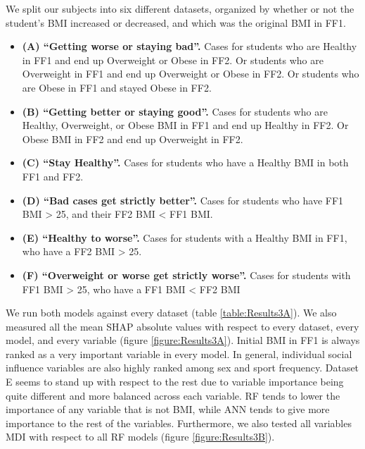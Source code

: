 We split our subjects into six different datasets, organized by whether or not the student's BMI increased or decreased, and which was the original BMI in FF1.

\begin{itemize}

    \item \textbf{(A) “Getting worse or staying bad”.} Cases for students who are Healthy in FF1 and end up Overweight or Obese in FF2. Or students who are Overweight in FF1 and end up Overweight or Obese in FF2. Or students who are Obese in FF1 and stayed Obese in FF2. 

    \item \textbf{(B) “Getting better or staying good”.} Cases for students who are Healthy, Overweight, or Obese BMI in FF1 and end up Healthy in FF2. Or Obese BMI in FF2 and end up Overweight in FF2. 

    \item \textbf{(C) “Stay Healthy”.} Cases for students who have a Healthy BMI in both FF1 and FF2. 

    \item \textbf{(D) “Bad cases get strictly better”.} Cases for students who have FF1 BMI > 25, and their FF2 BMI < FF1 BMI. 
    
    \item \textbf{(E) “Healthy to worse”.} Cases for students with a Healthy BMI in FF1, who have a FF2 BMI > 25. 

    \item \textbf{(F) “Overweight or worse get strictly worse”.} Cases for students with FF1 BMI > 25, who have a FF1 BMI < FF2 BMI 

\end{itemize}

We run both models against every dataset (table \ref{table:Results3A}). We also measured all the mean SHAP absolute values with respect to every dataset, every model, and every variable (figure \ref{figure:Results3A}). Initial BMI in FF1 is always ranked as a very important variable in every model. In general, individual social influence variables are also highly ranked among sex and sport frequency. Dataset E seems to stand up with respect to the rest due to variable importance being quite different and more balanced across each variable. RF tends to lower the importance of any variable that is not BMI, while ANN tends to give more importance to the rest of the variables. Furthermore, we also tested all variables MDI with respect to all RF models (figure \ref{figure:Results3B}). 


